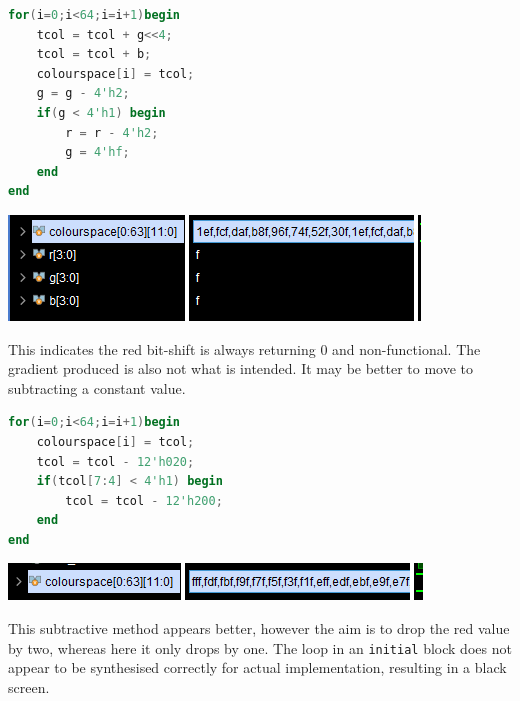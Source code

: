 \begin{minipage}{0.475\linewidth}
\begin{lstlisting}[language=Verilog]
for(i=0;i<64;i=i+1)begin
    tcol = tcol + g<<4;
    tcol = tcol + b;
    colourspace[i] = tcol;
    g = g - 4'h2;
    if(g < 4'h1) begin
        r = r - 4'h2;
        g = 4'hf;
    end
end
\end{lstlisting}
\end{minipage}\hfill
\begin{minipage}{0.5\linewidth}
    \centering
    \includegraphics[width=\linewidth]{figures/tb/3.png}
\end{minipage}
This indicates the red bit-shift is always returning 0 and non-functional. 
The gradient produced is also not what is intended. It may be better to move 
to subtracting a constant value. 

\begin{minipage}{0.475\linewidth}
\begin{lstlisting}[language=Verilog]
for(i=0;i<64;i=i+1)begin
    colourspace[i] = tcol;
    tcol = tcol - 12'h020;
    if(tcol[7:4] < 4'h1) begin
        tcol = tcol - 12'h200;
    end
end
\end{lstlisting}
\end{minipage}\hfill
\begin{minipage}{0.5\linewidth}
    \centering
    \includegraphics[width=\linewidth]{figures/tb/4.png}
\end{minipage}
This subtractive method appears better, however the aim is to drop the red value by two, whereas here it only drops by one.
The loop in an \lstinline|initial| block does not appear to be synthesised correctly for actual implementation, resulting
in a black screen.

